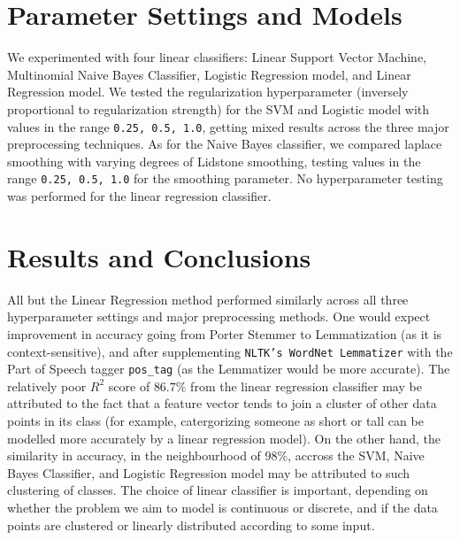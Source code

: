 \documentclass[11pt]{article}
\begin{document}
\section{Parameter Settings and Models}
We experimented with four linear classifiers: Linear Support Vector Machine, Multinomial Naive Bayes Classifier, 
Logistic Regression model, and Linear Regression model. We tested the regularization 
hyperparameter (inversely proportional to regularization strength) 
for the SVM and Logistic model with values in the range \texttt{0.25, 0.5, 1.0}, 
getting mixed results across the three major preprocessing techniques. 
As for the Naive Bayes classifier, we compared laplace smoothing with varying degrees of Lidstone smoothing,
testing values in the range \texttt{{0.25, 0.5, 1.0}} for the smoothing parameter.
No hyperparameter testing was performed for the linear regression classifier.

\section{Results and Conclusions}
All but the Linear Regression method
performed similarly across all three hyperparameter settings 
and major preprocessing methods. 
One would expect improvement in accuracy going from 
Porter Stemmer to Lemmatization 
(as it is context-sensitive),
and after supplementing \texttt{NLTK's WordNet Lemmatizer} 
with the Part of Speech tagger \texttt{pos\_tag}
(as the Lemmatizer would be more accurate). The relatively 
poor $R^2$ score of $86.7\%$ from the linear regression classifier
may be attributed to the fact that a feature vector tends to join
a cluster of other data points in its class
(for example, catergorizing someone as short or tall can 
be modelled more accurately by a linear regression model). On the other hand,
the similarity in accuracy, in the neighbourhood of $98\%$, accross the 
SVM, Naive Bayes Classifier, and Logistic Regression model may be attributed
to such clustering of classes. 
The choice of linear classifier is important, depending
on whether the problem we aim to model is continuous or discrete, and if
the data points are clustered or linearly distributed according to some input. 
\end{document}
